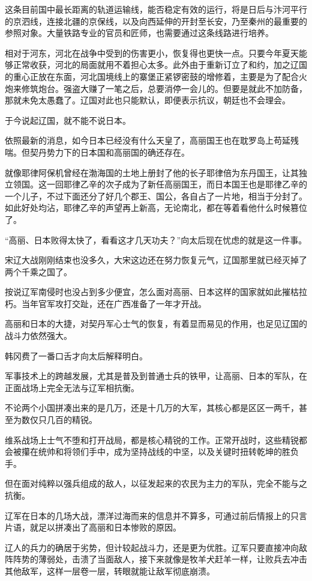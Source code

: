 这条目前国中最长距离的轨道运输线，能否稳定有效的运行，将是日后与汴河平行的京泗线，连接北疆的京保线，以及向西延伸的开封至长安，乃至秦州的最重要的参照对象。大量铁路专业的官员和匠师，也需要通过这条线路进行培养。

相对于河东，河北在战争中受到的伤害更小，恢复得也更快一点。只要今年夏天能够正常收获，河北的局面就用不着担心太多。此外由于重新订立了和约，加之辽国的重心正放在东面，河北国境线上的寨堡正紧锣密鼓的增修着，主要是为了配合火炮来修筑炮台。强盗大赚了一笔之后，总要消停一会儿的。但要是就此不加防备，那就未免太愚蠢了。辽国对此也只能默认，即便表示抗议，朝廷也不会理会。

于今说起辽国，就不能不说日本。

依照最新的消息，如今日本已经没有什么天皇了，高丽国王也在耽罗岛上苟延残喘。但契丹势力下的日本国和高丽国的确还存在。

就像耶律阿保机曾经在渤海国的土地上册封了他的长子耶律倍为东丹国王，让其独立领国。这一回耶律乙辛的次子成为了新任高丽国王，而日本国王也是耶律乙辛的一个儿子，不过下面还分了好几个郡王、国公，各自占了一片地，相当于分封了。如此好处均沾，耶律乙辛的声望再上新高，无论南北，都在等着看他什么时候篡位了。

“高丽、日本败得太快了，看看这才几天功夫？”向太后现在忧虑的就是这一件事。

宋辽大战刚刚结束也没多久，大宋这边还在努力恢复元气，辽国那里就已经灭掉了两个千乘之国了。

按说辽军南侵时也没占到多少便宜，怎么面对高丽、日本这样的国家就如此摧枯拉朽。当年官军攻打交趾，还在广西准备了一年才开战。

高丽和日本的大捷，对契丹军心士气的恢复，有着显而易见的作用，也足见辽国的战斗力依然强大。

韩冈费了一番口舌才向太后解释明白。

军事技术上的跨越发展，尤其是普及到普通士兵的铁甲，让高丽、日本的军队，在正面战场上完全无法与辽军相抗衡。

不论两个小国拼凑出来的是几万，还是十几万的大军，其核心都是区区一两千，甚至为数仅只几百的精锐。

维系战场上士气不堕和打开战局，都是核心精锐的工作。正常开战时，这些精锐都会被攥在统帅和将领们手中，成为坚持战线的中坚，以及关键时扭转乾坤的胜负手。

但在面对纯粹以强兵组成的敌人，以征发起来的农民为主力的军队，完全不能与之抗衡。

辽军在日本的几场大战，漂洋过海而来的信息并不算多，可通过前后情报上的只言片语，就足以拼凑出了高丽和日本惨败的原因。

辽人的兵力的确居于劣势，但计较起战斗力，还是更为优胜。辽军只要直接冲向敌阵阵势的薄弱处，击溃了当面敌人，接下来就像是牧羊犬赶羊一样，让败兵去冲击其他敌军，这样一层卷一层，转眼就能让敌军彻底崩溃。

